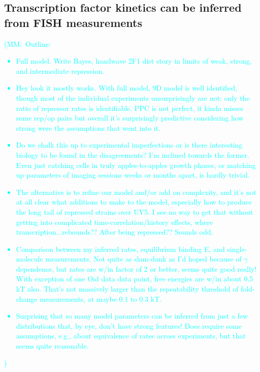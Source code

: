 \documentclass[12pt]{article}%
\newcommand{\mmnote}[1]{\textcolor{cyan}{(MM:~#1)}}
\begin{document}
\subsection{Transcription factor kinetics can be inferred from FISH measurements}
\mmnote{Outline:
\begin{itemize}
\item Full model.
Write Bayes, handwave 2F1 dist story in limits of weak, strong,
and intermediate repression.
\item Hey look it mostly works.
With full model, 9D model is well identified, though most of the
individual experiments unsurprisingly are not: only the ratio of
repressor rates is identifiable. PPC is not perfect, it kinda
misses some rep/op pairs but overall it's surprisingly predictive
considering how strong were the assumptions that went into it.
\item Do we chalk this up to experimental imperfections or is there
interesting biology to be found in the disagreements?
I'm inclined towards the former. Even just catching cells in
truly apples-to-apples growth phases, or matching up parameters
of imaging sessions weeks or months apart, is hardly trivial.
\item The alternative is to refine our model and/or add on
complexity, and it's not at all clear what additions to make to
the model, especially how to produce the long tail of repressed
strains over UV5. I see no way to get that without getting into
complicated time-correlation/history effects, where
transcription...rebounds?? After being repressed?? Sounds odd.
\item Comparison between my inferred rates, equilibrium binding E, and single-molecule measurements. Not quite as slam-dunk as I'd hoped because of $\gamma$ dependence, but rates are w/in factor of 2 or better, seems quite good really! With exception of one Oid data data point, free energies are w/in about 0.5 kT also. That's not massively larger than the repeatability threshold of fold-change measurements, at maybe 0.1 to 0.3 kT.
\item Surprising that so many model parameters can be inferred from just a few distributions that, by eye, don't have strong features! Does require some assumptions, e.g., about equivalence of rates across experiments, but that seems quite reasonable.
\end{itemize}
}
\end{document}

